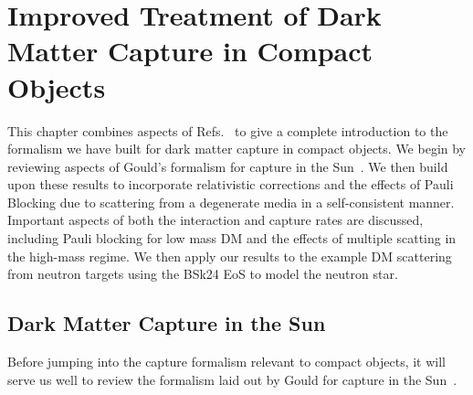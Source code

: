 \graphicspath{{img/capture_intro/}}

\chapter{Improved Treatment of Dark Matter Capture in Compact Objects}
\label{chapter:capture_intro}

\begin{synopsis}
This chapter combines aspects of Refs.~\cite{Bell:2020jou_sep_ImprovedTreatmentDark,Bell:2020lmm_mar_ImprovedTreatmentDark,Anzuini:2021lnv_nov_Improvedtreatmentdark} to give a complete introduction to the formalism we have built for dark matter capture in compact objects. We begin by reviewing aspects of Gould's formalism for capture in the Sun~\cite{Gould:1987ir_ResonantEnhancementsWIMP,Gould:1987ju_WeaklyInteractingMassive}. We then build upon these results to incorporate relativistic corrections and the effects of Pauli Blocking due to scattering from a degenerate media in a self-consistent manner. Important aspects of both the interaction and capture rates are discussed, including Pauli blocking for low mass DM and the effects of multiple scatting in the high-mass regime. We then apply our results to the example DM scattering from neutron targets using the BSk24 EoS to model the neutron star.
\end{synopsis}



\section{Dark Matter Capture in the Sun}
\label{ch3:sec:solar_capture_full}

Before jumping into the capture formalism relevant to compact objects, it will serve us well to review the formalism laid out by Gould for capture in the Sun~\cite{Gould:1987ju_WeaklyInteractingMassive, Gould:1987ir_ResonantEnhancementsWIMP}. 

